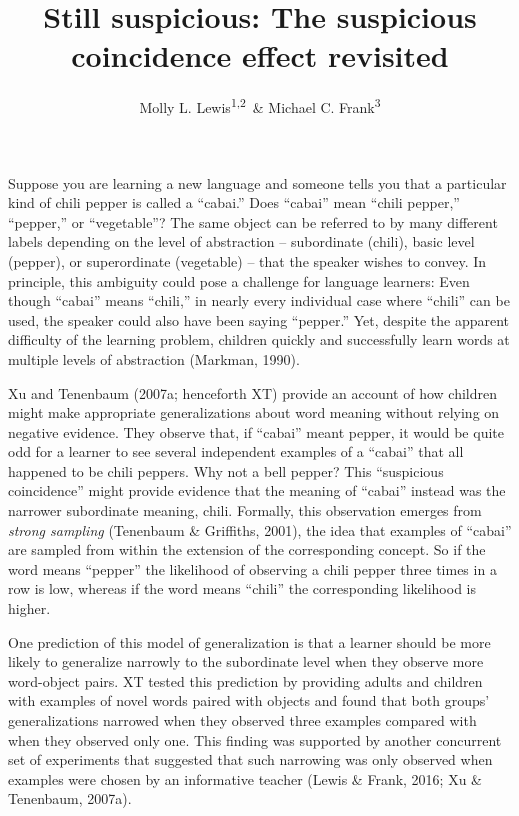 \documentclass[english,floatsintext,man]{apa6}
\title{Still suspicious: The suspicious coincidence effect revisited}
\author{Molly L. Lewis\textsuperscript{1,2}~\& Michael C. Frank\textsuperscript{3}}
\affiliation{
    \vspace{0.5cm}
          \textsuperscript{1} Computation Institute, University of Chicago\\
          \textsuperscript{2} Department of Psychology, University of Wisconsin, Madison\\
          \textsuperscript{3} Department of Psychology, Stanford University  }
\theoremstyle{definition}
\theoremstyle{definition}
\theoremstyle{definition}
\theoremstyle{remark}
\begin{document}
\maketitle

\setcounter{secnumdepth}{0}



Suppose you are learning a new language and someone tells you that a
particular kind of chili pepper is called a \enquote{cabai.} Does
\enquote{cabai} mean \enquote{chili pepper,} \enquote{pepper,} or
\enquote{vegetable}? The same object can be referred to by many
different labels depending on the level of abstraction -- subordinate
(chili), basic level (pepper), or superordinate (vegetable) -- that the
speaker wishes to convey. In principle, this ambiguity could pose a
challenge for language learners: Even though \enquote{cabai} means
\enquote{chili,} in nearly every individual case where \enquote{chili}
can be used, the speaker could also have been saying \enquote{pepper.}
Yet, despite the apparent difficulty of the learning problem, children
quickly and successfully learn words at multiple levels of abstraction
(Markman, 1990).

Xu and Tenenbaum (2007a; henceforth XT) provide an account of how
children might make appropriate generalizations about word meaning
without relying on negative evidence. They observe that, if
\enquote{cabai} meant pepper, it would be quite odd for a learner to see
several independent examples of a \enquote{cabai} that all happened to
be chili peppers. Why not a bell pepper? This \enquote{suspicious
coincidence} might provide evidence that the meaning of \enquote{cabai}
instead was the narrower subordinate meaning, chili. Formally, this
observation emerges from \emph{strong sampling} (Tenenbaum \& Griffiths,
2001), the idea that examples of \enquote{cabai} are sampled from within
the extension of the corresponding concept. So if the word means
\enquote{pepper} the likelihood of observing a chili pepper three times
in a row is low, whereas if the word means \enquote{chili} the
corresponding likelihood is higher.

One prediction of this model of generalization is that a learner should
be more likely to generalize narrowly to the subordinate level when they
observe more word-object pairs. XT tested this prediction by providing
adults and children with examples of novel words paired with objects and
found that both groups' generalizations narrowed when they observed
three examples compared with when they observed only one. This finding
was supported by another concurrent set of experiments that suggested
that such narrowing was only observed when examples were chosen by an
informative teacher (Lewis \& Frank, 2016; Xu \& Tenenbaum, 2007a).
\end{document}
